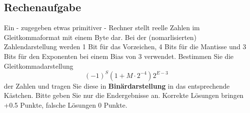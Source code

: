 \documentclass[a4paper]{article}
\begin{document}
\subsection{Rechenaufgabe}
Ein - zugegeben etwas primitiver - Rechner stellt reelle Zahlen im Gleitkommaformat mit einem Byte dar. Bei der (nomarlisierten) Zahlendarstellung werden 1 Bit für das Vorzeichen, 4 Bits für die Mantisse und 3 Bits für den Exponenten bei einem Bias von 3 verwendet. Bestimmen Sie die Gleitkommadarstellung
\[(-1)^S(1+M\cdot 2^{-4})2^{E-3}\]
der Zahlen und tragen Sie diese in \textbf{Binärdarstellung} in das entsprechende Kästchen. Bitte geben Sie nur die Endergebnisse an. Korrekte Lösungen bringen +0.5 Punkte, falsche Lösungen 0 Punkte.\\\\
\fbox{\parbox{\linewidth}{
\[-1 = \frac{1|0000|011}{S\quad M\quad E\quad}\]
}}\vspace*{5mm}
\fbox{\parbox{\linewidth}{
\[0.125 = \frac{0|0000|000}{S\quad M\quad E\quad}\]
}}\vspace*{5mm}
\fbox{\parbox{\linewidth}{
\[2.5 = \frac{0|0100|100}{S\quad M\quad E\quad}\]
}}\vspace*{5mm}
\fbox{\parbox{\linewidth}{
\[-1.25 = \frac{1|0100|011}{S\quad M\quad E\quad}\]
}}\vspace*{5mm}
\end{document}
